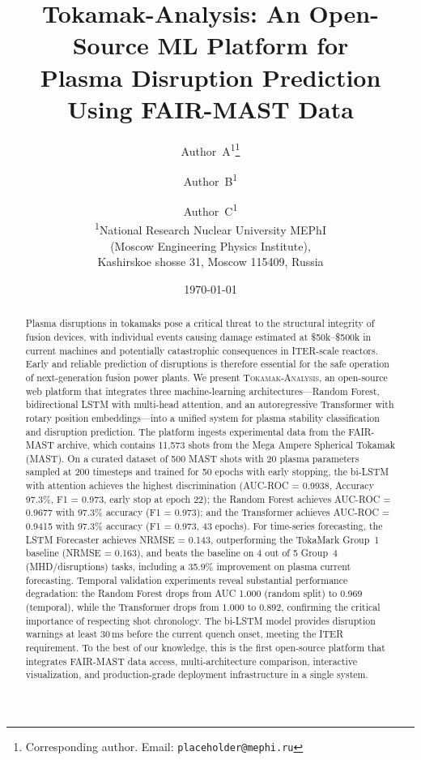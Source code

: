 \documentclass[twocolumn]{article}
\title{Tokamak-Analysis: An Open-Source ML Platform for\\ Plasma Disruption Prediction Using FAIR-MAST Data}
\author{
  Author~A\textsuperscript{1}\thanks{Corresponding author. Email: \texttt{placeholder@mephi.ru}} \and
  Author~B\textsuperscript{1} \and
  Author~C\textsuperscript{1} \\[6pt]
  \textsuperscript{1}National Research Nuclear University MEPhI\\
  (Moscow Engineering Physics Institute),\\
  Kashirskoe shosse 31, Moscow 115409, Russia
}
\date{\today}
\begin{document}
\maketitle

\begin{abstract}
Plasma disruptions in tokamaks pose a critical threat to the structural
integrity of fusion devices, with individual events causing damage
estimated at \$50k--\$500k in current machines and potentially
catastrophic consequences in ITER-scale reactors.
Early and reliable prediction of disruptions is therefore essential
for the safe operation of next-generation fusion power plants.
We present \textsc{Tokamak-Analysis}, an open-source web platform
that integrates three machine-learning architectures---Random Forest,
bidirectional LSTM with multi-head attention, and an autoregressive
Transformer with rotary position embeddings---into a unified system
for plasma stability classification and disruption prediction.
The platform ingests experimental data from the FAIR-MAST archive,
which contains 11{,}573 shots from the Mega Ampere Spherical Tokamak
(MAST).
On a curated dataset of 500 MAST shots with 20 plasma parameters
sampled at 200 timesteps and trained for 50 epochs with early stopping,
the bi-LSTM with attention achieves the highest discrimination
(AUC-ROC = 0.9938, Accuracy 97.3\%, F1 = 0.973, early stop at epoch 22);
the Random Forest achieves AUC-ROC = 0.9677 with 97.3\% accuracy (F1 = 0.973);
and the Transformer achieves AUC-ROC = 0.9415 with 97.3\% accuracy
(F1 = 0.973, 43 epochs).
For time-series forecasting, the LSTM Forecaster achieves NRMSE = 0.143,
outperforming the TokaMark Group~1 baseline (NRMSE = 0.163), and
beats the baseline on 4 out of 5 Group~4 (MHD/disruptions) tasks,
including a 35.9\% improvement on plasma current forecasting.
Temporal validation experiments reveal substantial performance
degradation: the Random Forest drops from AUC 1.000 (random split)
to 0.969 (temporal), while the Transformer drops from 1.000 to 0.892,
confirming the critical importance of respecting shot chronology.
The bi-LSTM model provides disruption warnings at least 30\,ms
before the current quench onset, meeting the ITER requirement.
To the best of our knowledge, this is the first open-source platform
that integrates FAIR-MAST data access, multi-architecture comparison,
interactive visualization, and production-grade deployment
infrastructure in a single system.
\end{abstract}
\end{document}
